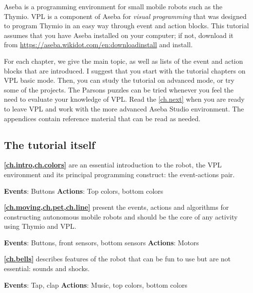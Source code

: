 Aseba is a programming environment for small mobile robots such as the
Thymio. VPL is a component of Aseba for \textit{visual programming} that
was designed to program Thymio in an easy way through event and action
blocks. This tutorial assumes that you have Aseba installed on your
computer; if not, download it from 
\url{https://aseba.wikidot.com/en:downloadinstall} and install.

\newpage


For each chapter, we give the main topic, as well as lists of the event
and action blocks that are introduced. I suggest that you start with the
tutorial chapters on VPL basic mode. Then, you can study the tutorial on
advanced mode, or try some of the projects. The Parsons puzzles can be
tried whenever you feel the need to evaluate your knowledge of VPL.
Read the \cref{ch.next} when you are ready to leave VPL and work with
the more advanced Aseba Studio environment. The appendices contain
reference material that can be read as needed.

\subsection*{The tutorial itself}

\textbf{\cref{ch.intro,ch.colors}} are an essential
introduction to the robot, the VPL environment and its principal
programming construct: the event-actions pair.

\textbf{Events}: Buttons \hfill \textbf{Actions}: Top colors, bottom colors

 \hfill {} \quad {}

\medskip

\textbf{\cref{ch.moving,ch.pet,ch.line}} present the events,
actions and algorithms for constructing autonomous mobile robots and
should be the core of any activity using Thymio and VPL.

\textbf{Events}: Buttons, front sensors, bottom sensors \hfill
\textbf{Actions}: Motors

 \quad{}\quad {} \hfill
{}

\medskip

\textbf{\cref{ch.bells}} describes features of the robot that can
be fun to use but are not essential: sounds and shocks.

\textbf{Events}: Tap, clap \hfill \textbf{Actions}: Music, top colors,
bottom colors

